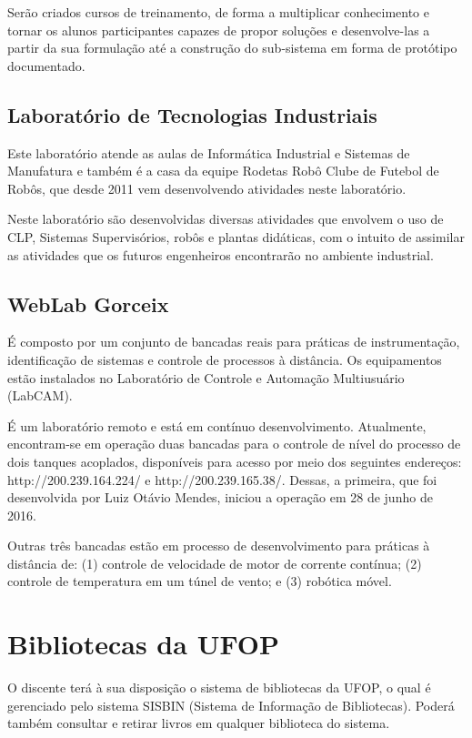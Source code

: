 \documentclass[
	12pt,				%
	openright,			%
	oneside,			%
	a4paper,			%
	english,			%
	brazil				%
	]{abntex2}
\begin{document}
Serão criados cursos de treinamento, de forma a multiplicar conhecimento e tornar os alunos participantes capazes de propor soluções e desenvolve-las a partir da sua formulação até a construção do sub-sistema em forma de protótipo documentado.

\subsection*{Laboratório de Tecnologias Industriais}

Este laboratório atende as aulas de Informática Industrial e Sistemas de Manufatura e também é a casa da equipe Rodetas Robô Clube de Futebol de Robôs, que desde 2011 vem desenvolvendo atividades neste laboratório.

Neste laboratório são desenvolvidas diversas atividades que envolvem o uso de CLP, Sistemas Supervisórios, robôs e plantas didáticas, com o intuito de assimilar as atividades que os futuros engenheiros encontrarão no ambiente industrial.

\subsection*{WebLab Gorceix}

É composto por um conjunto de bancadas reais para práticas de instrumentação, identificação de sistemas e controle de processos à distância. Os equipamentos estão instalados no Laboratório de Controle e Automação Multiusuário (LabCAM).

É um laboratório remoto e está em contínuo desenvolvimento. Atualmente, encontram-se em operação duas bancadas para o controle de nível do processo de dois tanques acoplados, disponíveis para acesso por meio dos seguintes endereços: http://200.239.164.224/ e http://200.239.165.38/. Dessas, a primeira, que foi desenvolvida por Luiz Otávio Mendes, iniciou a operação em 28 de junho de 2016.

Outras três bancadas estão em processo de desenvolvimento para práticas à distância de: (1) controle de velocidade de motor de corrente contínua; (2) controle de temperatura em um túnel de vento; e (3) robótica móvel.

\section{Bibliotecas da UFOP}
O discente terá à sua disposição o sistema de bibliotecas da UFOP, o qual é gerenciado pelo sistema SISBIN (Sistema de Informação de Bibliotecas). Poderá também consultar e retirar livros em qualquer biblioteca do sistema.
\end{document}
